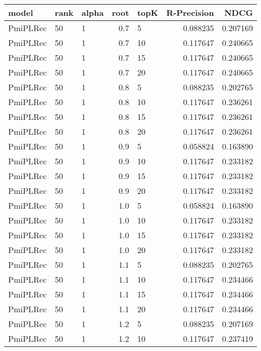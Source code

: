 \begin{tabular}{lllrlrr}
\toprule
     model & rank & alpha &  root & topK &  R-Precision &      NDCG \\
\midrule
  PmiPLRec &   50 &     1 &   0.7 &    5 &     0.088235 &  0.207169 \\
  PmiPLRec &   50 &     1 &   0.7 &   10 &     0.117647 &  0.240665 \\
  PmiPLRec &   50 &     1 &   0.7 &   15 &     0.117647 &  0.240665 \\
  PmiPLRec &   50 &     1 &   0.7 &   20 &     0.117647 &  0.240665 \\
  PmiPLRec &   50 &     1 &   0.8 &    5 &     0.088235 &  0.202765 \\
  PmiPLRec &   50 &     1 &   0.8 &   10 &     0.117647 &  0.236261 \\
  PmiPLRec &   50 &     1 &   0.8 &   15 &     0.117647 &  0.236261 \\
  PmiPLRec &   50 &     1 &   0.8 &   20 &     0.117647 &  0.236261 \\
  PmiPLRec &   50 &     1 &   0.9 &    5 &     0.058824 &  0.163890 \\
  PmiPLRec &   50 &     1 &   0.9 &   10 &     0.117647 &  0.233182 \\
  PmiPLRec &   50 &     1 &   0.9 &   15 &     0.117647 &  0.233182 \\
  PmiPLRec &   50 &     1 &   0.9 &   20 &     0.117647 &  0.233182 \\
  PmiPLRec &   50 &     1 &   1.0 &    5 &     0.058824 &  0.163890 \\
  PmiPLRec &   50 &     1 &   1.0 &   10 &     0.117647 &  0.233182 \\
  PmiPLRec &   50 &     1 &   1.0 &   15 &     0.117647 &  0.233182 \\
  PmiPLRec &   50 &     1 &   1.0 &   20 &     0.117647 &  0.233182 \\
  PmiPLRec &   50 &     1 &   1.1 &    5 &     0.088235 &  0.202765 \\
  PmiPLRec &   50 &     1 &   1.1 &   10 &     0.117647 &  0.234466 \\
  PmiPLRec &   50 &     1 &   1.1 &   15 &     0.117647 &  0.234466 \\
  PmiPLRec &   50 &     1 &   1.1 &   20 &     0.117647 &  0.234466 \\
  PmiPLRec &   50 &     1 &   1.2 &    5 &     0.088235 &  0.207169 \\
  PmiPLRec &   50 &     1 &   1.2 &   10 &     0.117647 &  0.237419 \\

\end{tabular}
